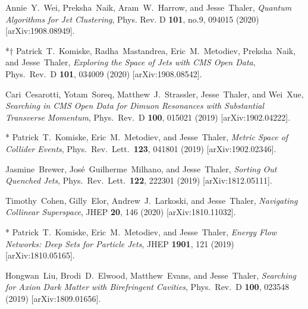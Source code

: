 \documentclass[11pt]{article}
\renewcommand{\bibitem}[1]{\item}
\begin{document}
\begin{list}{[]\addtocounter{jessecount}{-1}}{\leftmargin=3em \itemsep=4pt}
\bibitem{Wei:2019rqy}
Annie~Y.~Wei, Preksha~Naik, Aram~W.~Harrow, and Jesse~Thaler,
\emph{Quantum Algorithms for Jet Clustering},
Phys. Rev. D \textbf{101}, no.9, 094015 (2020)
[arXiv:1908.08949].

\bibitem{Komiske:2019jim}
*$\dagger$ Patrick~T.~Komiske, Radha~Mastandrea, Eric~M.~Metodiev, Preksha~Naik, and Jesse~Thaler,
\emph{Exploring the Space of Jets with CMS Open Data},
Phys.\ Rev.\ D \textbf{101}, 034009 (2020)
[arXiv:1908.08542].

\bibitem{Cesarotti:2019nax} 
  Cari~Cesarotti, Yotam~Soreq, Matthew~J.~Strassler, Jesse~Thaler, and Wei~Xue,
  \emph{Searching in CMS Open Data for Dimuon Resonances with Substantial Transverse Momentum},
  Phys.\ Rev.\ D {\bf 100}, 015021 (2019)
  [arXiv:1902.04222].

\bibitem{Komiske:2019fks} 
  * Patrick~T.~Komiske, Eric~M.~Metodiev, and Jesse~Thaler,
  \emph{Metric Space of Collider Events},
  Phys.\ Rev.\ Lett.\  {\bf 123}, 041801 (2019)
  [arXiv:1902.02346].


\bibitem{Brewer:2018dfs} 
  Jasmine~Brewer, Jos\'e~Guilherme~Milhano, and Jesse~Thaler,
  \emph{Sorting Out Quenched Jets},
  Phys.\ Rev.\ Lett.\  {\bf 122}, 222301 (2019)
  [arXiv:1812.05111].


\bibitem{Cohen:2018qvn} 
  Timothy~Cohen, Gilly~Elor, Andrew~J.~Larkoski, and Jesse~Thaler,
  \emph{Navigating Collinear Superspace},
  JHEP \textbf{20}, 146 (2020)
  [arXiv:1810.11032].

\bibitem{Komiske:2018cqr} 
  * Patrick~T.~Komiske, Eric~M.~Metodiev, and Jesse~Thaler,
  \emph{Energy Flow Networks: Deep Sets for Particle Jets},
  JHEP {\bf 1901}, 121 (2019)
  [arXiv:1810.05165].

\bibitem{Liu:2018icu} 
  Hongwan~Liu, Brodi~D.~Elwood, Matthew~Evans, and Jesse~Thaler,
  \emph{Searching for Axion Dark Matter with Birefringent Cavities},
  Phys.\ Rev.\ D {\bf 100}, 023548 (2019)
  [arXiv:1809.01656].


\end{list}
\end{document}
